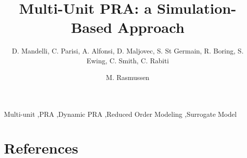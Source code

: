 \documentclass{elsarticle}
\begin{document}
\begin{frontmatter}

\title{Multi-Unit PRA: a Simulation-Based Approach}

\author{D. Mandelli, C. Parisi, A. Alfonsi, D. Maljovec, S. St Germain, R. Boring, S. Ewing, C. Smith, C. Rabiti}
\address{Idaho National Laboratory (INL), 2525 Fremont Ave, 83402 Idaho Falls (ID), USA}

\author{M. Rasmussen}
\address{Norwegian University of Science and Technology (NTNU)}

\begin{abstract}
  
\end{abstract}

\begin{keyword}
Multi-unit \sep PRA \sep Dynamic PRA \sep Reduced Order Modeling \sep Surrogate Model
\end{keyword}

\end{frontmatter}

\linenumbers

\printnomenclature[1in]














\section*{References}


\end{document}
